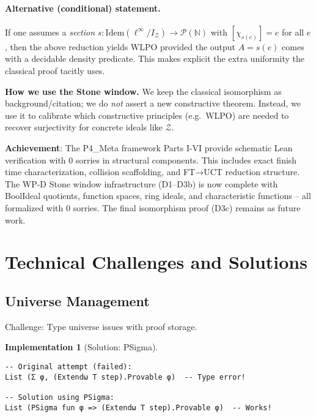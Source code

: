 \documentclass[11pt]{article}
\newif\iffullversion
\theoremstyle{definition}
\newtheorem{implementation}[theorem]{Implementation}
\theoremstyle{remark}
\begin{document}
\paragraph{Alternative (conditional) statement.}
If one assumes a \emph{section} $s:\mathrm{Idem}(\ell^\infty/I_{\mathcal Z})\to\mathcal P(\mathbb N)$
with $[\chi_{s(e)}]=e$ for all $e$, then the above reduction yields WLPO provided the output $A=s(e)$
comes with a decidable density predicate.
This makes explicit the extra uniformity the classical proof tacitly uses.

\begin{mdframed}[style=status]
\textbf{How we use the Stone window.}
We keep the classical isomorphism as background/citation; we do \emph{not} assert a new constructive theorem.
Instead, we use it to calibrate which constructive principles (e.g.\ WLPO) are needed to recover surjectivity for concrete ideals like $\mathcal Z$.
\end{mdframed}

\begin{mdframed}[style=achievement]
\textbf{Achievement}: The P4\_Meta framework Parts I-VI provide schematic Lean verification with 0 sorries in structural components. This includes exact finish time characterization, collision scaffolding, and FT→UCT reduction structure. The WP-D Stone window infrastructure (D1--D3b) is now complete with BoolIdeal quotients, function spaces, ring ideals, and characteristic functions -- all formalized with 0 sorries. The final isomorphism proof (D3c) remains as future work.
\end{mdframed}
\iffullversion
\section{Technical Challenges and Solutions}

\subsection{Universe Management}

Challenge: Type universe issues with proof storage.

\begin{implementation}[Solution: PSigma]
\begin{lstlisting}[language={}]
-- Original attempt (failed):
List (Σ φ, (Extendω T step).Provable φ)  -- Type error!

-- Solution using PSigma:
List (PSigma fun φ => (Extendω T step).Provable φ)  -- Works!
\end{lstlisting}
\end{implementation}
\end{document}
